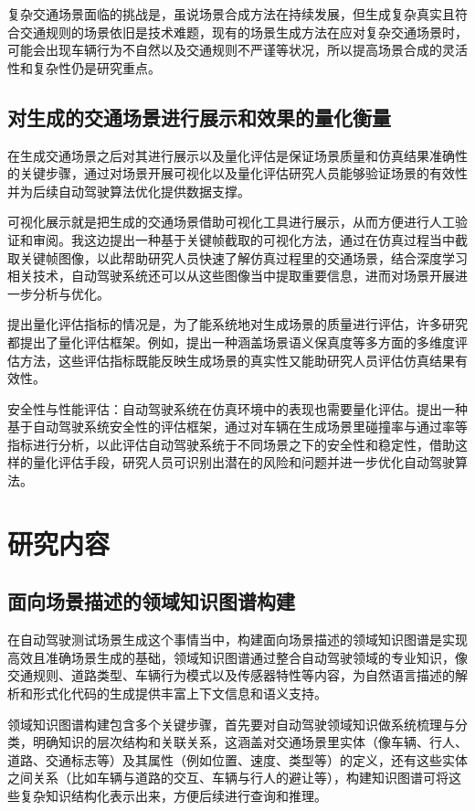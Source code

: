 复杂交通场景面临的挑战是，虽说场景合成方法在持续发展，但生成复杂真实且符合交通规则的场景依旧是技术难题，现有的场景生成方法在应对复杂交通场景时，可能会出现车辆行为不自然以及交通规则不严谨等状况，所以提高场景合成的灵活性和复杂性仍是研究重点。

\subsection{对生成的交通场景进行展示和效果的量化衡量}
在生成交通场景之后对其进行展示以及量化评估是保证场景质量和仿真结果准确性的关键步骤\cite{peng2025data}，通过对场景开展可视化以及量化评估研究人员能够验证场景的有效性并为后续自动驾驶算法优化提供数据支撑。

可视化展示就是把生成的交通场景借助可视化工具进行展示，从而方便进行人工验证和审阅。我这边提出一种基于关键帧截取的可视化方法\cite{fang2025yolo}，通过在仿真过程当中截取关键帧图像，以此帮助研究人员快速了解仿真过程里的交通场景，结合深度学习相关技术，自动驾驶系统还可以从这些图像当中提取重要信息，进而对场景开展进一步分析与优化。

提出量化评估指标的情况是，为了能系统地对生成场景的质量进行评估，许多研究都提出了量化评估框架。例如，提出一种涵盖场景语义保真度等多方面的多维度评估方法\cite{zhu2024tsgan}，这些评估指标既能反映生成场景的真实性又能助研究人员评估仿真结果有效性。

安全性与性能评估：自动驾驶系统在仿真环境中的表现也需要量化评估。提出一种基于自动驾驶系统安全性的评估框架，通过对车辆在生成场景里碰撞率与通过率等指标进行分析，以此评估自动驾驶系统于不同场景之下的安全性和稳定性，借助这样的量化评估手段，研究人员可识别出潜在的风险和问题并进一步优化自动驾驶算法。

\section{研究内容}
\subsection{面向场景描述的领域知识图谱构建}
在自动驾驶测试场景生成这个事情当中，构建面向场景描述的领域知识图谱是实现高效且准确场景生成的基础，领域知识图谱通过整合自动驾驶领域的专业知识\cite{Wang2021advSim}，像交通规则、道路类型、车辆行为模式以及传感器特性等内容，为自然语言描述的解析和形式化代码的生成提供丰富上下文信息和语义支持。

领域知识图谱构建包含多个关键步骤\cite{Xu2022Safebench}，首先要对自动驾驶领域知识做系统梳理与分类，明确知识的层次结构和关联关系，这涵盖对交通场景里实体（像车辆、行人、道路、交通标志等）及其属性（例如位置、速度、类型等）的定义，还有这些实体之间关系（比如车辆与道路的交互、车辆与行人的避让等），构建知识图谱可将这些复杂知识结构化表示出来，方便后续进行查询和推理。

